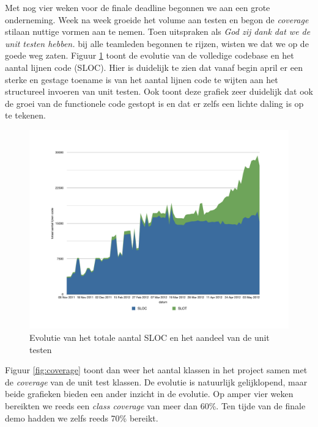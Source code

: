 \documentclass[12pt,a4paper]{report}
\begin{document}
Met nog vier weken voor de finale deadline begonnen we aan een grote onderneming. Week na week groeide het volume aan testen en begon de \emph{coverage} stilaan nuttige vormen aan te nemen. Toen uitspraken als \emph{God zij dank dat we de unit testen hebben.} bij alle teamleden begonnen te rijzen, wisten we dat we op de goede weg zaten. Figuur \ref{fig:sloc} toont de evolutie van de volledige codebase en het aantal lijnen code (SLOC). Hier is duidelijk te zien dat vanaf begin april er een sterke en gestage toename is van het aantal lijnen code te wijten aan het structureel invoeren van unit testen. Ook toont deze grafiek zeer duidelijk dat ook de groei van de functionele code gestopt is en dat er zelfs een lichte daling is op te tekenen.

\begin{figure}[htbp]
  \centering
  \includegraphics[width=115mm]{resources/sloc.pdf}
  \caption{Evolutie van het totale aantal SLOC en het aandeel van de unit testen}
  \label{fig:sloc}
\end{figure}

Figuur \ref{fig:coverage} toont dan weer het aantal klassen in het project samen met de \emph{coverage} van de unit test klassen. De evolutie is natuurlijk gelijklopend, maar beide grafieken bieden een ander inzicht in de evolutie. Op amper vier weken bereikten we reeds een \emph{class coverage} van meer dan 60\%. Ten tijde van de finale demo hadden we zelfs reeds 70\% bereikt.
\end{document}
